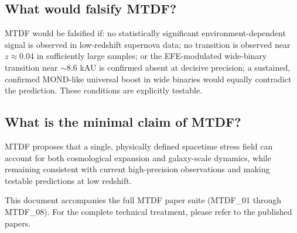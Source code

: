 \documentclass[11pt,a4paper]{article}
\begin{document}
\subsection{What would falsify MTDF?}
MTDF would be falsified if: no statistically significant environment-dependent signal is observed in low-redshift supernova data; no transition is observed near $z \approx 0.04$ in sufficiently large samples; or the EFE-modulated wide-binary transition near $\sim 8.6$ kAU is confirmed absent at decisive precision; a sustained, confirmed MOND-like universal boost in wide binaries would equally contradict the prediction. These conditions are explicitly testable.

\subsection{What is the minimal claim of MTDF?}
MTDF proposes that a single, physically defined spacetime stress field can account for both cosmological expansion and galaxy-scale dynamics, while remaining consistent with current high-precision observations and making testable predictions at low redshift.

This document accompanies the full MTDF paper suite (MTDF\_\allowbreak{}01 through MTDF\_\allowbreak{}08). For the complete technical treatment, please refer to the published papers.
\end{document}
